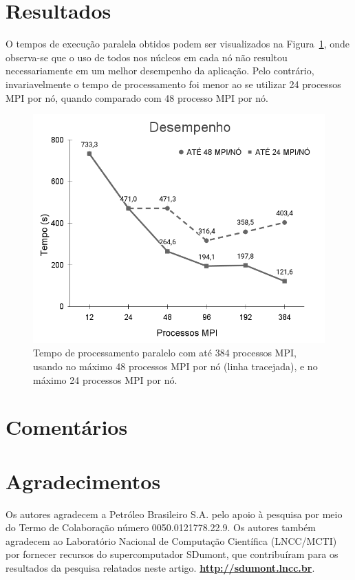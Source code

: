 \documentclass[12pt]{article}
\begin{document}
\section{Resultados}
%
O tempos de execução paralela obtidos podem ser visualizados na Figura~\ref{fig:perfpernode}, onde observa-se que o uso de todos nos núcleos em cada nó não resultou necessariamente em um melhor desempenho da aplicação. Pelo contrário, invariavelmente o tempo de processamento foi menor ao se utilizar 24 processos MPI por nó, quando comparado com 48 processo MPI por nó.
%
\begin{figure}[ht]
\centering
\includegraphics[width=.5\textwidth]{figures/perfpernode.png}
\caption{Tempo de processamento paralelo com até 384 processos MPI, usando no máximo 48 processos MPI por nó (linha tracejada), e no máximo 24 processos MPI por nó.}
\label{fig:perfpernode}
\end{figure}


\section{Comentários}


\section*{Agradecimentos}
Os autores agradecem a Petróleo Brasileiro S.A. pelo apoio à pesquisa por meio do Termo de Colaboração número 0050.0121778.22.9. Os autores também agradecem ao Laboratório Nacional de Computação Científica (LNCC/MCTI) por fornecer recursos do supercomputador SDumont, que contribuíram para os resultados da pesquisa relatados neste artigo. \textbf{\url{http://sdumont.lncc.br}}.



\end{document}
